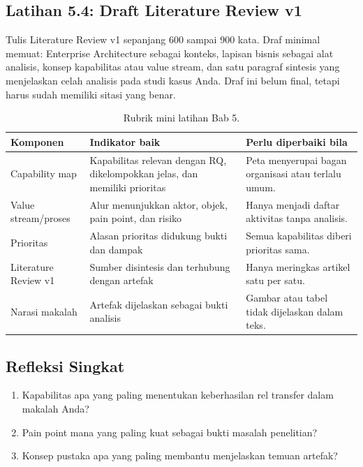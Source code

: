 \subsection*{Latihan 5.4: Draft Literature Review v1}

Tulis Literature Review v1 sepanjang 600 sampai 900 kata. Draf minimal memuat:
Enterprise Architecture sebagai konteks, lapisan bisnis sebagai alat analisis,
konsep kapabilitas atau value stream, dan satu paragraf sintesis yang
menjelaskan celah analisis pada studi kasus Anda. Draf ini belum final, tetapi
harus sudah memiliki sitasi yang benar.

\begin{table}[htbp]
\centering
\scriptsize
\caption{Rubrik mini latihan Bab 5.}
\label{tab:rubrik-bab4}
\begin{tabularx}{\textwidth}{@{}p{} X X@{}}
\hline
\textbf{Komponen} & \textbf{Indikator baik} & \textbf{Perlu diperbaiki bila} \\
\hline
Capability map & Kapabilitas relevan dengan RQ, dikelompokkan jelas, dan
memiliki prioritas & Peta menyerupai bagan organisasi atau terlalu umum. \\
Value stream/proses & Alur menunjukkan aktor, objek, pain point, dan risiko &
Hanya menjadi daftar aktivitas tanpa analisis. \\
Prioritas & Alasan prioritas didukung bukti dan dampak & Semua kapabilitas
diberi prioritas sama. \\
Literature Review v1 & Sumber disintesis dan terhubung dengan artefak & Hanya
meringkas artikel satu per satu. \\
Narasi makalah & Artefak dijelaskan sebagai bukti analisis & Gambar atau tabel
tidak dijelaskan dalam teks. \\
\hline
\end{tabularx}
\end{table}

\subsection*{Refleksi Singkat}

\begin{enumerate}
  \item Kapabilitas apa yang paling menentukan keberhasilan rel transfer dalam
        makalah Anda?
  \item Pain point mana yang paling kuat sebagai bukti masalah penelitian?
  \item Konsep pustaka apa yang paling membantu menjelaskan temuan artefak?
\end{enumerate}

